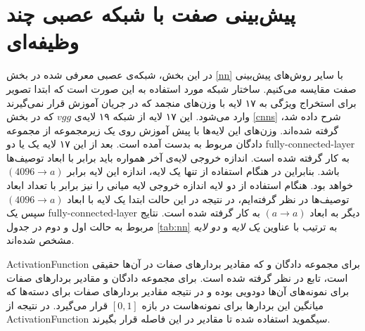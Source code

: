 \section{پیش‌بینی صفت با شبکه عصبی چند وظیفه‌ای} \label{exp:nn}

در این بخش، شبکه‌ی عصبی معرفی شده در بخش \ref{nn} با سایر روش‌های پیش‌بینی صفت مقایسه می‌کنیم.
ساختار شبکه مورد استفاده به این صورت است که ابتدا تصویر برای استخراج ویژگی به ۱۷ لایه با وزن‌های منجمد که در جریان آموزش قرار نمی‌گیرند وارد می‌شود. این ۱۷ لایه از شبکه ۱۹ لایه‌ی $vgg$ که در بخش
\ref{cnns}
شرح داده شد، گرفته شده‌اند. وزن‌های این لایه‌ها با پیش آموزش روی یک زیرمجموعه از مجموعه دادگان  مربوط به  بدست آمده است.
بعد از این ۱۷ لایه یک یا دو \gls{fully-connected-layer} به کار گرفته شده است. اندازه خروجی لایه‌ی آخر همواره باید برابر با ابعاد توصیف‌ها باشد. بنابراین در هنگام استفاده از تنها یک لایه، اندازه این لایه برابر
$(4096 \rightarrow a)$
خواهد بود. هنگام استفاده از دو لایه اندازه خروجی لایه میانی را نیز برابر با تعداد ابعاد توصیف‌ها در نظر گرفته‌ایم، در نتیجه در این حالت ابتدا یک لایه با ابعاد
$(4096 \rightarrow a)$
سپس یک \gls{fully-connected-layer} دیگر به ابعاد
$(a \rightarrow a)$
به کار گرفته شده است. نتایج مربوط به حالت اول و دوم  در جدول \ref{tab:nn} به ترتیب با عناوین
\textit{ یک لایه}
و
\textit{ دو لایه}
مشخص شده‌اند.

 \gls{ActivationFunction} برای مجموعه دادگان   و  که مقادیر بردارهای صفات در آن‌ها حقیقی است، تابع  در نظر گرفته شده است. برای مجموعه دادگان  و   مقادیر بردارهای صفات برای نمونه‌های آن‌ها دودویی بوده و در نتیجه مقادیر بردارهای صفات برای دسته‌ها که میانگین این بردارها برای نمونه‌هاست در بازه
$[0,1]$
قرار می‌گیرد. در نتیجه از \gls{ActivationFunction} سیگموید استفاده شده تا مقادیر در این فاصله قرار بگیرند.

